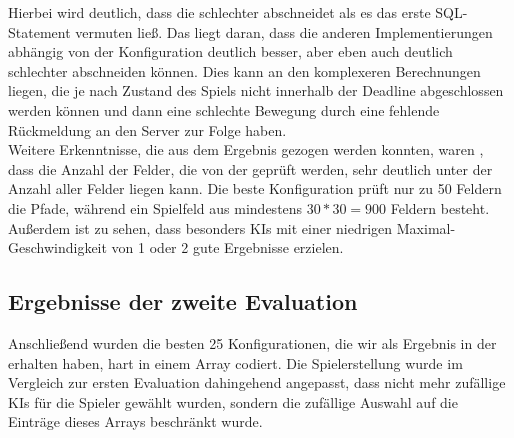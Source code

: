 Hierbei wird deutlich, dass die  schlechter abschneidet als es das erste SQL-Statement vermuten ließ.
Das liegt daran, dass die anderen Implementierungen abhängig von der Konfiguration deutlich besser, aber eben auch
deutlich schlechter abschneiden können.
Dies kann an den komplexeren Berechnungen liegen, die je nach Zustand des Spiels nicht innerhalb der Deadline
abgeschlossen werden können und dann eine schlechte Bewegung durch eine fehlende Rückmeldung an den Server zur Folge
haben. \\

Weitere Erkenntnisse, die aus dem Ergebnis gezogen werden konnten, waren \ua, dass die Anzahl der Felder, die von der
 geprüft werden, sehr deutlich unter der Anzahl aller Felder liegen kann.
Die beste Konfiguration prüft nur zu 50 Feldern die Pfade, während ein Spielfeld aus mindestens $30 * 30 = 900$ Feldern
besteht.
Außerdem ist zu sehen, dass besonders \ac{KI}s mit einer niedrigen Maximal-Geschwindigkeit von 1 oder 2 gute Ergebnisse
erzielen.

\subsection{Ergebnisse der zweite Evaluation}
\label{subsec:zweite-evaluation}

Anschließend wurden die besten 25 Konfigurationen, die wir als Ergebnis in der 
erhalten haben, hart in einem Array codiert.
Die Spielerstellung wurde im Vergleich zur ersten Evaluation dahingehend angepasst, dass nicht mehr zufällige \ac{KI}s
für die Spieler gewählt wurden, sondern die zufällige Auswahl auf die Einträge dieses Arrays beschränkt wurde.


